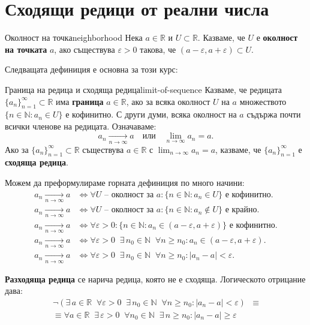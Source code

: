 \section{Сходящи редици от реални числа}

\begin{definition}{Околност на точка}{neighborhood}
Нека $a \in \mathbb{R}$ и $U \subset \mathbb{R}$. Казваме, че $U$ е \textbf{околност на точката} $a$, ако съществува $\varepsilon > 0$ такова, че $(a - \varepsilon, a + \varepsilon) \subset U$.
\end{definition}

Следващата дефиниция е основна за този курс:

\begin{definition}{Граница на редица и сходяща редица}{limit-of-sequence}
Казваме, че редицата $\{a_n\}_{n=1}^\infty \subset \mathbb{R}$ има \textbf{граница} $a \in \mathbb{R}$, ако за всяка околност $U$ на $a$ множеството $\{n \in \mathbb{N} : a_n \in U\}$ е кофинитно. С други думи, всяка околност на $a$ съдържа почти всички членове на редицата. Означаваме:
\[
a_n \xrightarrow[n\to\infty]{} a \quad \text{или} \quad \lim_{n\to\infty} a_n = a.
\]
Ако за $\{a_n\}_{n=1}^\infty \subset \mathbb{R}$ съществува $a \in \mathbb{R}$ с $\lim_{n\to\infty} a_n = a$, казваме, че $\{a_n\}_{n=1}^\infty$ е \textbf{сходяща редица}.
\end{definition}

Можем да преформулираме горната дефиниция по много начини:
\begin{align*}
a_n \xrightarrow[n\to\infty]{} a &\iff \forall U \text{ -- околност за } a : \{n \in \mathbb{N} : a_n \in U\} \text{ е кофинитно.} \\
a_n \xrightarrow[n\to\infty]{} a &\iff \forall U \text{ -- околност за } a : \{n \in \mathbb{N} : a_n \notin U\} \text{ е крайно.} \\
a_n \xrightarrow[n\to\infty]{} a &\iff \forall \varepsilon > 0 : \{n \in \mathbb{N} : a_n \in (a - \varepsilon, a + \varepsilon)\} \text{ е кофинитно.} \\
a_n \xrightarrow[n\to\infty]{} a &\iff \forall \varepsilon > 0 \;\; \exists\, n_0 \in \mathbb{N} \;\; \forall n \ge n_0 : a_n \in (a - \varepsilon, a + \varepsilon). \\
a_n \xrightarrow[n\to\infty]{} a &\iff \forall \varepsilon > 0 \;\; \exists\, n_0 \in \mathbb{N} \;\; \forall n \ge n_0 : |a_n - a| < \varepsilon.
\end{align*}

\textbf{Разходяща редица} се нарича редица, която не е сходяща. Логическото отрицание дава:
\begin{align*}
\neg (\exists\, a \in \mathbb{R} \;\; \forall \varepsilon > 0 \;\; \exists\, n_0 \in \mathbb{N} \;\; \forall n \ge n_0 : |a_n - a| < \varepsilon) &\equiv \\
\equiv \forall a \in \mathbb{R} \;\; \exists\, \varepsilon > 0 \;\; \forall n_0 \in \mathbb{N} \;\; \exists\, n \ge n_0 : |a_n - a| \ge \varepsilon
\end{align*}

